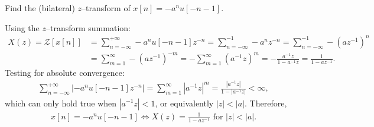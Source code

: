 \documentclass{report}
\begin{document}
\begin{example}
    Find the (bilateral) $z$--transform of $x[n]=-a^n u[-n-1]$. 
\end{example}
\begin{solution}
    Using the $z$--transform summation:
    \begin{align*}
        X(z) = \mathcal{Z}[x[n]] &= \sum_{n=-\infty}^{+\infty} -a^n u[-n-1] z^{-n} = \sum_{n=-\infty}^{-1} -a^n z^{-n} = \sum_{n=-\infty}^{-1} -(az^{-1})^n \\
        &= \sum_{m=1}^{\infty} -(az^{-1})^{-m} = -\sum_{m=1}^{\infty} (a^{-1}z)^m = -\frac{a^{-1}z}{1-a^{-1}z} = \frac{1}{1-az^{-1}}.
    \end{align*}
    Testing for absolute convergence:
    \begin{align*}
        \sum_{n=-\infty}^{+\infty} \left|-a^n u[-n-1] z^{-n}\right| = \sum_{m=1}^{\infty} \left|a^{-1}z\right|^m = \frac{\left|a^{-1}z\right|}{1-\left|a^{-1}z\right|} < \infty,
    \end{align*}
    which can only hold true when $\left|a^{-1}z\right| < 1$, or equivalently $|z|<|a|$. Therefore,
    \begin{align*}
        x[n] = -a^n u[-n-1] \iff X(z) = \frac{1}{1-az^{-1}} \text{ for } |z| < |a|.
    \end{align*}
\end{solution}
\end{document}
